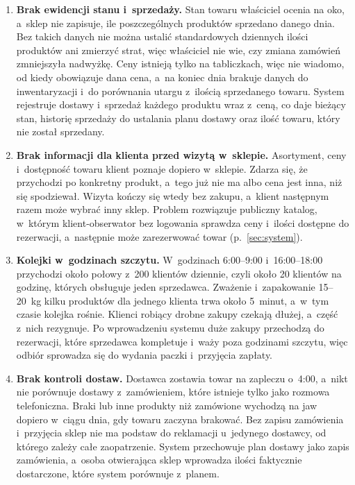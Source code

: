 \documentclass[12pt,a4paper,oneside]{article}
\newcounter{pu}
\begin{document}
\begin{enumerate}[label=\textbf{P\arabic*.},ref=P\arabic*,leftmargin=1.2cm]
	\item \label{prob:ewidencja}
	\textbf{Brak ewidencji stanu i~sprzedaży.} Stan towaru właściciel ocenia na oko, a~sklep nie zapisuje, ile poszczególnych produktów sprzedano danego dnia. Bez takich danych nie można ustalić standardowych dziennych ilości produktów ani zmierzyć strat, więc właściciel nie wie, czy zmiana zamówień zmniejszyła nadwyżkę. Ceny istnieją tylko na tabliczkach, więc nie wiadomo, od kiedy obowiązuje dana cena, a~na koniec dnia brakuje danych do inwentaryzacji i~do porównania utargu z~ilością sprzedanego towaru. System rejestruje dostawy i~sprzedaż każdego produktu wraz z~ceną, co daje bieżący stan, historię sprzedaży do ustalania planu dostawy oraz ilość towaru, który nie został sprzedany.

	\item \label{prob:informacja}
	\textbf{Brak informacji dla klienta przed wizytą w~sklepie.} Asortyment, ceny i~dostępność towaru klient poznaje dopiero w~sklepie. Zdarza się, że przychodzi po konkretny produkt, a~tego już nie ma albo cena jest inna, niż się spodziewał. Wizyta kończy się wtedy bez zakupu, a~klient następnym razem może wybrać inny sklep. Problem rozwiązuje publiczny katalog, w~którym klient-obserwator bez logowania sprawdza ceny i~ilości dostępne do rezerwacji, a~następnie może zarezerwować towar (p.~\ref{sec:system}).

	\item \label{prob:kolejki}
	\textbf{Kolejki w~godzinach szczytu.} W~godzinach 6:00--9:00 i~16:00--18:00 przychodzi około połowy z~200 klientów dziennie, czyli około 20 klientów na godzinę, których obsługuje jeden sprzedawca. Zważenie i~zapakowanie 15--20~kg kilku produktów dla jednego klienta trwa około 5~minut, a~w~tym czasie kolejka rośnie. Klienci robiący drobne zakupy czekają dłużej, a~część z~nich rezygnuje. Po wprowadzeniu systemu duże zakupy przechodzą do rezerwacji, które sprzedawca kompletuje i~waży poza godzinami szczytu, więc odbiór sprowadza się do wydania paczki i~przyjęcia zapłaty.

	\item \label{prob:dostawa}
	\textbf{Brak kontroli dostaw.} Dostawca zostawia towar na zapleczu o~4:00, a~nikt nie porównuje dostawy z~zamówieniem, które istnieje tylko jako rozmowa telefoniczna. Braki lub inne produkty niż zamówione wychodzą na jaw dopiero w~ciągu dnia, gdy towaru zaczyna brakować. Bez zapisu zamówienia i~przyjęcia sklep nie ma podstaw do reklamacji u~jedynego dostawcy, od którego zależy całe zaopatrzenie. System przechowuje plan dostawy jako zapis zamówienia, a~osoba otwierająca sklep wprowadza ilości faktycznie dostarczone, które system porównuje z~planem.


\end{enumerate}
\end{document}
